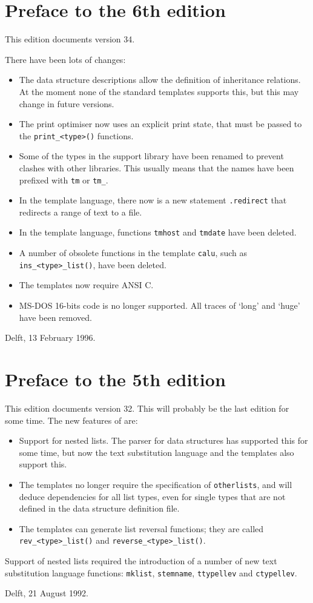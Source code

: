 \section{Preface to the 6th edition}
This edition documents {\Tm} version 34.
\par
There have been lots of changes:
\begin{itemize}
\item The data structure descriptions allow the definition of inheritance
      relations. At the moment none of the standard templates supports
      this, but this may change in future versions.
\item The print optimiser now uses an explicit print state, that must
      be passed to the \verb"print_<type>()" functions.
\item Some of the types in the {\C} support library have been
      renamed to prevent clashes with other libraries. This usually means
      that the names have been prefixed with \verb'tm' or \verb'tm_'.
\item In the template language, there now is a new statement \verb'.redirect'
      that redirects a range of text to a file.
\item In the template language, functions \verb'tmhost' and \verb'tmdate' 
      have been deleted.
\item A number of obsolete functions in the {\C} template \verb'calu', such as
      \verb"ins_<type>_list()", have been deleted.
\item The {\C} templates now require ANSI C.
\item MS-DOS 16-bits code is no longer supported. All traces of `long'
      and `huge' have been removed.
\end{itemize}
\begin{flushright}
Delft, 13 February 1996.
\end{flushright}
\section{Preface to the 5th edition}
This edition documents {\Tm} version 32.
This will probably be the last edition for some time. The new features
of {\Tm} are:
\begin{itemize}
\item Support for nested lists. The parser for data structures has
supported this for some time, but now the text substitution language
and the {\C} templates also support this.
\item The {\C} templates no longer require the specification of
\texttt{otherlists}, and will deduce dependencies for all list types,
even for single types that are not defined in the data structure definition
file.
\item The {\C} templates can generate list reversal functions; they
      are called \verb+rev_<type>_list()+ and \verb+reverse_<type>_list()+.
\end{itemize}
Support of nested lists required the introduction of a number of new
{\Tm} text substitution language functions: \verb+mklist+, \verb+stemname+,
\verb+ttypellev+ and \verb+ctypellev+.
\begin{flushright}
Delft, 21 August 1992.
\end{flushright}
